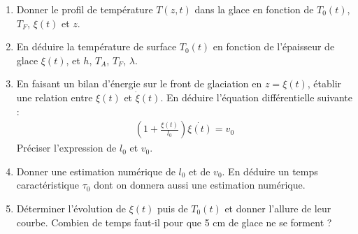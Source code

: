 \begin{enumerate}

	\item Donner le profil de température $T(z,t)$ dans la glace en fonction de $T_0(t)$, $T_F$, $\xi(t)$ et $z$. 
	
	\item En déduire la température de surface $T_0(t)$ en fonction de l'épaisseur de glace $\xi(t)$, et $h$, $T_A$, $T_F$, $\lambda$.
	
	\item En faisant un bilan d'énergie sur le front de glaciation en $z=\xi(t)$, établir une relation entre $\xi(t)$ et $\dot{\xi}(t)$. En déduire l'équation différentielle suivante :
	\begin{align*}
		\left( 1+\frac{\xi(t)}{l_0}\right) \dot{\xi(t)}=v_0
	\end{align*}
	Préciser l'expression de $l_0$ et $v_0$.
	
	\item Donner une estimation numérique de $l_0$ et de $v_0$. En déduire un temps caractéristique $\tau_0$ dont on donnera aussi une estimation numérique. %
	
	\item Déterminer l'évolution de $\xi(t)$ puis de $T_0(t)$ et donner l'allure de leur courbe. Combien de temps faut-il pour que 5 cm de glace ne se forment ?
	
\end{enumerate}	
	
\newpage

